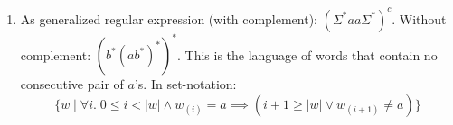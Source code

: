 \begin{exercise}{}
\begin{solution}
\begin{enumerate}
      \item 
        As generalized regular expression (with complement): \((\Sigma^* aa
        \Sigma^*)^c\). Without complement: \((b^*(ab^*)^*)^*\). This is the language
        of words that contain no consecutive pair of \(a\)'s. In set-notation:
        \begin{equation*}
          \{w \mid \forall i.\; 0 \leq i < |w| \land w_{(i)} = a \implies (i + 1 \geq |w| \lor w_{(i + 1)} \neq a)\}
        \end{equation*}
    \end{enumerate}
  \end{solution}

\end{exercise}





  

          

